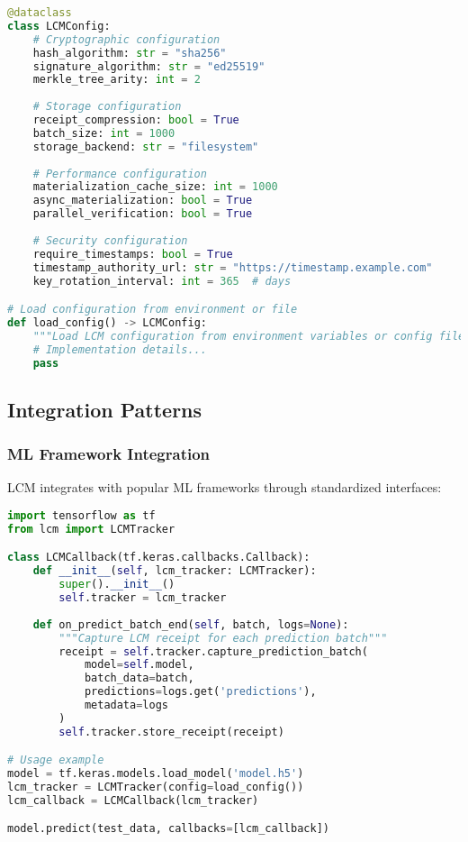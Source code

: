 \documentclass[12pt,a4paper]{article}
\begin{document}
\begin{lstlisting}[language=Python, caption=LCM Configuration]
@dataclass
class LCMConfig:
    # Cryptographic configuration
    hash_algorithm: str = "sha256"
    signature_algorithm: str = "ed25519"
    merkle_tree_arity: int = 2
    
    # Storage configuration
    receipt_compression: bool = True
    batch_size: int = 1000
    storage_backend: str = "filesystem"
    
    # Performance configuration
    materialization_cache_size: int = 1000
    async_materialization: bool = True
    parallel_verification: bool = True
    
    # Security configuration
    require_timestamps: bool = True
    timestamp_authority_url: str = "https://timestamp.example.com"
    key_rotation_interval: int = 365  # days

# Load configuration from environment or file
def load_config() -> LCMConfig:
    """Load LCM configuration from environment variables or config file"""
    # Implementation details...
    pass
\end{lstlisting}

\subsection{Integration Patterns}

\subsubsection{ML Framework Integration}

LCM integrates with popular ML frameworks through standardized interfaces:

\begin{lstlisting}[language=Python, caption=TensorFlow Integration Example]
import tensorflow as tf
from lcm import LCMTracker

class LCMCallback(tf.keras.callbacks.Callback):
    def __init__(self, lcm_tracker: LCMTracker):
        super().__init__()
        self.tracker = lcm_tracker
    
    def on_predict_batch_end(self, batch, logs=None):
        """Capture LCM receipt for each prediction batch"""
        receipt = self.tracker.capture_prediction_batch(
            model=self.model,
            batch_data=batch,
            predictions=logs.get('predictions'),
            metadata=logs
        )
        self.tracker.store_receipt(receipt)

# Usage example
model = tf.keras.models.load_model('model.h5')
lcm_tracker = LCMTracker(config=load_config())
lcm_callback = LCMCallback(lcm_tracker)

model.predict(test_data, callbacks=[lcm_callback])
\end{lstlisting}
\end{document}

